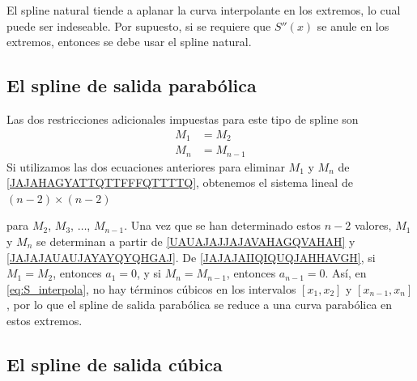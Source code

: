 El spline natural tiende a aplanar la curva interpolante en los extremos, lo cual puede ser indeseable. Por supuesto, si se requiere que $S''(x)$ se anule en los extremos, entonces se debe usar el spline natural.

\subsection*{El spline de salida parabólica}

Las dos restricciones adicionales impuestas para este tipo de spline son
\begin{align}
    M_1 & = M_2 \label{UAUAJAJJAJAVAHAGQVAHAH} \\
    M_n & = M_{n-1} \label{JAJAJAUAUJAYAYQYQHGAJ}
\end{align}
Si utilizamos las dos ecuaciones anteriores para eliminar $M_1$ y $M_n$ de \eqref{JAJAHAGYATTQTTFFFQTTTTQ}, obtenemos el sistema lineal de $(n - 2) \times (n - 2)$
\begin{matrizn}
\end{matrizn}
para $M_2$, $M_3$, $\dots$, $M_{n-1}$. Una vez que se han determinado estos $n - 2$ valores, $M_1$ y $M_n$ se determinan a partir de \eqref{UAUAJAJJAJAVAHAGQVAHAH} y \eqref{JAJAJAUAUJAYAYQYQHGAJ}. De \eqref{JAJAJAIIQIQUQJAHHAVGH}, si $M_1 = M_2$, entonces $a_1 = 0$, y si $M_n = M_{n-1}$, entonces $a_{n-1} = 0$. Así, en \eqref{eq:S_interpola}, no hay términos cúbicos en los intervalos $[x_1, x_2]$ y $[x_{n-1}, x_n]$, por lo que el spline de salida parabólica se reduce a una curva parabólica en estos extremos.

\subsection*{El spline de salida cúbica}


